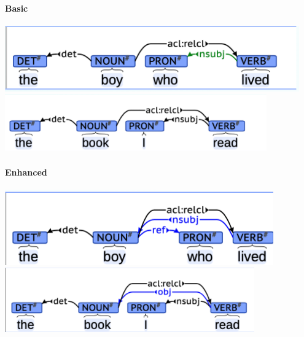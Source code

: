 \documentclass[10pt]{report}
\begin{document}
\begin{multicols}{2}
\paragraph{Basic}
\begin{center}
	\includegraphics[scale=0.5]{57.png}\\
	\includegraphics[scale=0.5]{58.png}
\end{center}
\paragraph{Enhanced}
\begin{center}
	\includegraphics[scale=0.5]{59.png}\\
	\includegraphics[scale=0.5]{60.png}
\end{center}
\end{multicols}
\pagebreak
\end{document}
